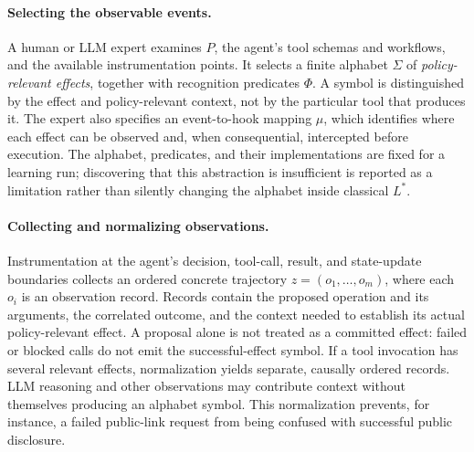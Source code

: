 \paragraph{Selecting the observable events.}
A human or LLM expert examines $P$, the agent's tool schemas and workflows, and the available instrumentation points. It selects a finite alphabet $\Sigma$ of \emph{policy-relevant effects}, together with recognition predicates $\Phi$. A symbol is distinguished by the effect and policy-relevant context, not by the particular tool that produces it. The expert also specifies an event-to-hook mapping $\mu$, which identifies where each effect can be observed and, when consequential, intercepted before execution. The alphabet, predicates, and their implementations are fixed for a learning run; discovering that this abstraction is insufficient is reported as a limitation rather than silently changing the alphabet inside classical $L^*$.

\paragraph{Collecting and normalizing observations.}
Instrumentation at the agent's decision, tool-call, result, and state-update boundaries collects an ordered concrete trajectory $z=(o_1,\ldots,o_m)$, where each $o_i$ is an observation record. Records contain the proposed operation and its arguments, the correlated outcome, and the context needed to establish its actual policy-relevant effect. A proposal alone is not treated as a committed effect: failed or blocked calls do not emit the successful-effect symbol. If a tool invocation has several relevant effects, normalization yields separate, causally ordered records. LLM reasoning and other observations may contribute context without themselves producing an alphabet symbol. This normalization prevents, for instance, a failed public-link request from being confused with successful public disclosure.

